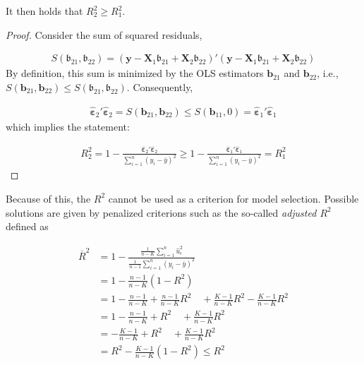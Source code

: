 \documentclass[]{book}
\theoremstyle{definition}
\theoremstyle{definition}
\theoremstyle{definition}
\theoremstyle{remark}
\let\BeginKnitrBlock\begin \let\EndKnitrBlock\end
\begin{document}
It then holds that \(R^2_2\geq R^2_1\).

\BeginKnitrBlock{proof}
{}Consider the sum of squared residuals,

\begin{align*}
S(\mathbf{\mathfrak{b}}_{21},\mathbf{\mathfrak{b}}_{22})=(\mathbf{y}-\mathbf{X}_1\mathbf{\mathfrak{b}}_{21}+\mathbf{X}_2\mathbf{\mathfrak{b}}_{22})'(\mathbf{y}-\mathbf{X}_1\mathbf{\mathfrak{b}}_{21}+\mathbf{X}_2\mathbf{\mathfrak{b}}_{22})
\end{align*}
By definition, this sum is minimized by the OLS estimators \(\mathbf{b}_{21}\)
and \(\mathbf{b}_{22}\), i.e.,
\(S(\mathbf{b}_{21},\mathbf{b}_{22})\leq S(\mathbf{\mathfrak{b}}_{21},\mathbf{\mathfrak{b}}_{22})\).
Consequently,

\begin{align*}
\hat{\boldsymbol{\varepsilon}}_{2}'\hat{\boldsymbol{\varepsilon}}_{2}=S(\mathbf{b}_{21},\mathbf{b}_{22})\leq S(\mathbf{b}_{11},0)=\hat{\boldsymbol{\varepsilon}}_{1}'\hat{\boldsymbol{\varepsilon}}_{1}
\end{align*}
which implies the statement:

\begin{align*}
R_2^2=1-\frac{\hat{\boldsymbol{\varepsilon}}_{2}'\hat{\boldsymbol{\varepsilon}}_{2}}{\sum_{i=1}^n\left(y_i-\bar{y}\right)^2}\geq
1-\frac{\hat{\boldsymbol{\varepsilon}}_{1}'\hat{\boldsymbol{\varepsilon}}_{1}}{\sum_{i=1}^n\left(y_i-\bar{y}\right)^2}=R_1^2
\end{align*}
\EndKnitrBlock{proof}

Because of this, the \(R^2\) cannot be used as a criterion for model selection. Possible solutions are given by penalized criterions such as the so-called \emph{adjusted \(R^2\)} defined as

\[
\begin{align*}
  \overline{R}^2 &= 1-\frac{ \frac{1}{n-K} \sum_{i=1}^n \hat{u}_i^2}{ \frac{1}{n-1} \sum_{i=1}^n \left(y_i-\bar{y}\right)^2} \\
   &= 1-\frac{n-1}{n-K}\left(1-R^2\right) \\
    &= 1-\frac{n-1}{n-K}+\frac{n-1}{n-K}R^2\quad+\frac{K-1}{n-K}R^2-\frac{K-1}{n-K}R^2 \\
    &= 1-\frac{n-1}{n-K}+R^2\quad+\frac{K-1}{n-K}R^2 \\
    &= -\frac{K-1}{n-K}+R^2\quad+\frac{K-1}{n-K}R^2 \\
   &= R^2-\frac{K-1}{n-K}\left(1-R^2\right) \leq R^2
\end{align*}
\]
\end{document}
